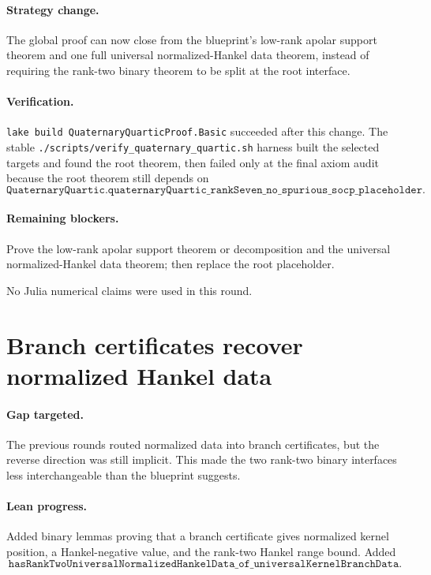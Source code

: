 \documentclass[11pt]{article}
\begin{document}
\paragraph{Strategy change.}
The global proof can now close from the blueprint's low-rank apolar support
theorem and one full universal normalized-Hankel data theorem, instead of
requiring the rank-two binary theorem to be split at the root interface.

\paragraph{Verification.}
\texttt{lake build QuaternaryQuarticProof.Basic} succeeded after this change.
The stable \texttt{./scripts/verify\_quaternary\_quartic.sh} harness built the
selected targets and found the root theorem, then failed only at the final axiom
audit because the root theorem still depends on
\[
\texttt{QuaternaryQuartic.quaternaryQuartic\_rankSeven\_no\_spurious\_socp\_placeholder}.
\]

\paragraph{Remaining blockers.}
Prove the low-rank apolar support theorem or decomposition and the universal
normalized-Hankel data theorem; then replace the root placeholder.

No Julia numerical claims were used in this round.

\section*{Branch certificates recover normalized Hankel data}

\paragraph{Gap targeted.}
The previous rounds routed normalized data into branch certificates, but the
reverse direction was still implicit.  This made the two rank-two binary
interfaces less interchangeable than the blueprint suggests.

\paragraph{Lean progress.}
Added binary lemmas proving that a branch certificate gives normalized kernel
position, a Hankel-negative value, and the rank-two Hankel range bound.  Added
\[
\texttt{hasRankTwoUniversalNormalizedHankelData\_of\_universalKernelBranchData}.
\]
\end{document}
